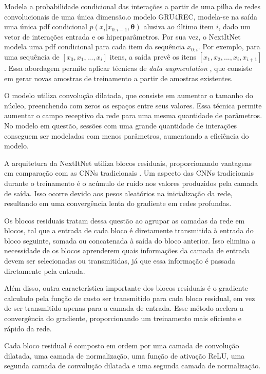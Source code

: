 Modela a probabilidade condicional das interações a partir de uma pilha de redes
convolucionais de uma única dimensão.o modelo GRU4REC, modela-se na
saída uma única pdf condicional $p(x_i|x_{0:i-1}, \mathbf{\theta})$ alusiva ao
último item $i$, dado um vetor de interações entrada e os hiperparâmetros. Por
sua vez, o NextItNet modela uma pdf condicional para cada item da sequência
$x_{0:i}$. Por exemplo, para uma sequência de $[x_0, x_1, ..., x_i]$ itens, a
saída prevê os itens $[x_1, x_2, ..., x_i, x_{i+1}]$. Essa abordagem permite
aplicar técnicas de \textit{data augmentation} \cite{tan2016improved}, que
consiste em gerar novas amostras de treinamento a partir de amostras existentes.

O modelo utiliza convolução dilatada, que consiste em aumentar o tamanho do
núcleo, preenchendo com zeros os espaços entre seus valores. Essa técnica
permite aumentar o campo receptivo da rede para uma mesma quantidade de
parâmetros. No modelo em questão, sessões com uma grande quantidade de
interações conseguem ser modeladas com menos parâmetros, aumentando a eficiência
do modelo.

A arquitetura da NextItNet utiliza blocos residuais, proporcionando vantagens em
comparação com as CNNs tradicionais \cite{he2016deep}. Um aspecto das CNNs
tradicionais durante o treinamento é o acúmulo de ruído nos valores produzidos
pela camada de saída. Isso ocorre devido aos pesos aleatórios na inicialização
da rede, resultando em uma convergência lenta do gradiente em redes profundas.

Os blocos residuais tratam dessa questão ao agrupar as camadas da rede em
blocos, tal que a entrada de cada bloco é diretamente transmitida à entrada do
bloco seguinte, somada ou concatenada à saída do bloco anterior. Isso elimina a
necessidade de os blocos aprenderem quais informações da camada de entrada devem
ser selecionadas ou transmitidas, já que essa informação é passada diretamente
pela entrada.

Além disso, outra característica importante dos blocos residuais é o gradiente
calculado pela função de custo ser transmitido para cada bloco residual, em vez
de ser transmitido apenas para a camada de entrada. Esse método acelera a
convergência do gradiente, proporcionando um treinamento mais eficiente e rápido
da rede.

Cada bloco residual é composto em ordem por uma camada de convolução dilatada,
uma camada de normalização, uma função de ativação ReLU, uma segunda camada de
convolução dilatada e uma segunda camada de normalização.


